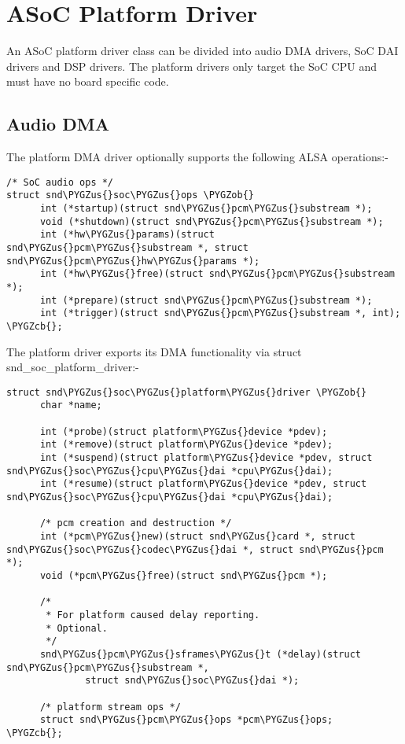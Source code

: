\documentclass[a4paper,8pt,english]{sphinxmanual}
\def\PYGZus{\char`\_}
\def\PYGZob{\char`\{}
\def\PYGZcb{\char`\}}
\begin{document}
\section{ASoC Platform Driver}
\label{sound/soc/platform:asoc-platform-driver}\label{sound/soc/platform::doc}
An ASoC platform driver class can be divided into audio DMA drivers, SoC DAI
drivers and DSP drivers. The platform drivers only target the SoC CPU and must
have no board specific code.


\subsection{Audio DMA}
\label{sound/soc/platform:audio-dma}
The platform DMA driver optionally supports the following ALSA operations:-

\begin{Verbatim}[commandchars=\\\{\}]
/* SoC audio ops */
struct snd\PYGZus{}soc\PYGZus{}ops \PYGZob{}
      int (*startup)(struct snd\PYGZus{}pcm\PYGZus{}substream *);
      void (*shutdown)(struct snd\PYGZus{}pcm\PYGZus{}substream *);
      int (*hw\PYGZus{}params)(struct snd\PYGZus{}pcm\PYGZus{}substream *, struct snd\PYGZus{}pcm\PYGZus{}hw\PYGZus{}params *);
      int (*hw\PYGZus{}free)(struct snd\PYGZus{}pcm\PYGZus{}substream *);
      int (*prepare)(struct snd\PYGZus{}pcm\PYGZus{}substream *);
      int (*trigger)(struct snd\PYGZus{}pcm\PYGZus{}substream *, int);
\PYGZcb{};
\end{Verbatim}

The platform driver exports its DMA functionality via struct
snd\_soc\_platform\_driver:-

\begin{Verbatim}[commandchars=\\\{\}]
struct snd\PYGZus{}soc\PYGZus{}platform\PYGZus{}driver \PYGZob{}
      char *name;

      int (*probe)(struct platform\PYGZus{}device *pdev);
      int (*remove)(struct platform\PYGZus{}device *pdev);
      int (*suspend)(struct platform\PYGZus{}device *pdev, struct snd\PYGZus{}soc\PYGZus{}cpu\PYGZus{}dai *cpu\PYGZus{}dai);
      int (*resume)(struct platform\PYGZus{}device *pdev, struct snd\PYGZus{}soc\PYGZus{}cpu\PYGZus{}dai *cpu\PYGZus{}dai);

      /* pcm creation and destruction */
      int (*pcm\PYGZus{}new)(struct snd\PYGZus{}card *, struct snd\PYGZus{}soc\PYGZus{}codec\PYGZus{}dai *, struct snd\PYGZus{}pcm *);
      void (*pcm\PYGZus{}free)(struct snd\PYGZus{}pcm *);

      /*
       * For platform caused delay reporting.
       * Optional.
       */
      snd\PYGZus{}pcm\PYGZus{}sframes\PYGZus{}t (*delay)(struct snd\PYGZus{}pcm\PYGZus{}substream *,
              struct snd\PYGZus{}soc\PYGZus{}dai *);

      /* platform stream ops */
      struct snd\PYGZus{}pcm\PYGZus{}ops *pcm\PYGZus{}ops;
\PYGZcb{};
\end{Verbatim}
\end{document}
